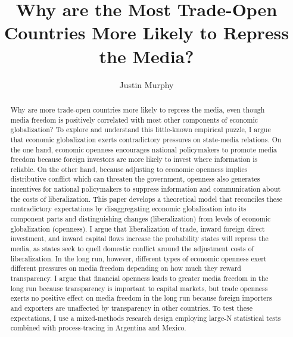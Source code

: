 \documentclass[a4paper]{article}\usepackage[]{graphicx}\usepackage[]{color}
\begin{document}
\title{Why are the Most Trade-Open Countries More Likely to Repress the Media?}

\author{Justin Murphy}

\maketitle

\begin{singlespace}
\begin{abstract}
Why are more trade-open countries more likely to repress the media, even though media freedom is positively correlated with most other components of economic globalization? To explore and understand this little-known empirical puzzle, I argue that economic globalization exerts contradictory pressures on state-media relations. On the one hand, economic openness encourages national policymakers to promote media freedom because foreign investors are more likely to invest where information is reliable. On the other hand, because adjusting to economic openness implies distributive conflict which can threaten the government, openness also generates incentives for national policymakers to suppress information and communication about the costs of liberalization. This paper develops a theoretical model that reconciles these contradictory expectations by disaggregating economic globalization into its component parts and distinguishing changes (liberalization) from levels of economic globalization (openness). I argue that liberalization of trade, inward foreign direct investment, and inward capital flows increase the probability states will repress the media, as states seek to quell domestic conflict around the adjustment costs of liberalization. In the long run, however, different types of economic openness exert different pressures on media freedom depending on how much they reward transparency. I argue that financial openness leads to greater media freedom in the long run because transparency is important to capital markets, but trade openness exerts no positive effect on media freedom in the long run because foreign importers and exporters are unaffected by transparency in other countries. To test these expectations, I use a mixed-methods research design employing large-N statistical tests combined with process-tracing in Argentina and Mexico.
\end{abstract}
\end{singlespace}

\vspace{0.3cm}
\end{document}
